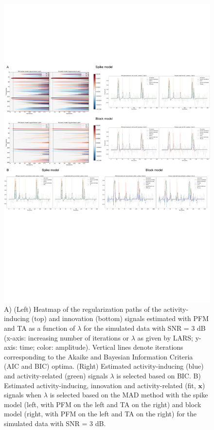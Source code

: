 \begin{figure}[t!]
    \begin{center}
        \includegraphics[width=\textwidth]{figures/figure_sim.pdf}
    \end{center}
    \caption{A) (Left) Heatmap of the regularization paths of the activity-inducing (top) and innovation (bottom) signals estimated with PFM and TA as a function of \(\lambda\) for the simulated data with SNR = 3 dB (x-axis: increasing number of iterations or \(\lambda\) as given by LARS; y-axis: time; color: amplitude). Vertical lines denote iterations corresponding to the Akaike and Bayesian Information Criteria (AIC and BIC) optima. (Right) Estimated activity-inducing (blue) and activity-related (green) signals \(\lambda\) is selected based on BIC. B) Estimated activity-inducing, innovation and activity-related (fit, \(\mathbf{x}\)) signals when \(\lambda\) is selected based on the MAD method with the spike model (left, with PFM on the left and TA on the right) and block model (right, with PFM on the left and TA on the right) for the simulated data with SNR = 3 dB.}
\label{fig:sim}
\end{figure}

